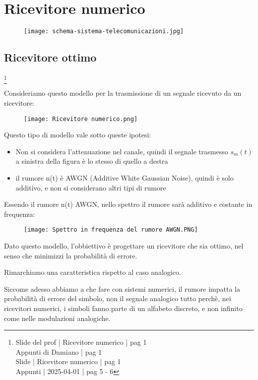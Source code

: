 \chapter{Ricevitore numerico}

\begin{figure}[h]
    \centering
    \texttt{[image: schema-sistema-telecomunicazioni.jpg]}
\end{figure}

\newpage 

\section{Ricevitore ottimo}
\footnote{Slide del prof | Ricevitore numerico | pag 1 \\  
Appunti di Damiano | pag 1 \\
Slide | Ricevitore numerico | pag 1 \\
Appunti | 2025-04-01 | pag 5 - 6
}

Consideriamo questo modello per la trasmissione di un segnale ricevuto da un ricevitore: 

\begin{figure}[h]
    \centering
    \texttt{[image: Ricevitore numerico.png]}
\end{figure}

Questo tipo di modello vale sotto queste ipotesi: 

\begin{itemize}
    \item Non si considera l'attenuazione nel canale, quindi il segnale trasmesso $s_m (t)$ a sinistra della figura è lo stesso di quello a destra
    \item il rumore n(t) è AWGN (Additive White Gaussian Noise), quindi è solo additivo, e non si considerano altri tipi di rumore
\end{itemize}

Essendo il rumore n(t) AWGN, nello spettro il rumore sarà additivo e costante in frequenza: 

\begin{figure}[h]
    \centering
    \texttt{[image: Spettro in frequenza del rumore AWGN.PNG]}
\end{figure}

Dato questo modello, l'obbiettivo è progettare un ricevitore che sia ottimo, 
nel senso che minimizzi la probabilità di errore. \newline 

\begin{tcolorbox}
    Rimarchiamo una caratteristica rispetto al caso analogico. \newline 

    Siccome adesso abbiamo a che fare con sistemi numerici, 
    il rumore impatta la probabilità di errore del simbolo, 
    non il segnale analogico tutto perchè, nei ricevitori numerici, 
    i simboli fanno parte di un alfabeto discreto, e non infinito come nelle modulazioni analogiche. 
\end{tcolorbox}


